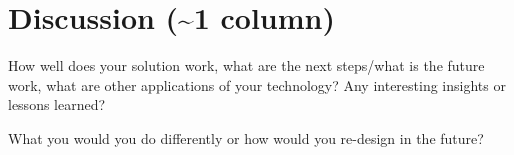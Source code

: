 \section{Discussion (\textasciitilde 1 column)}
\label{sec:discussion}

How well does your solution work, what are the next steps/what is the future
work, what are other applications of your technology? Any interesting insights
or lessons learned?

What you would you do differently or how would you re-design in the future?

